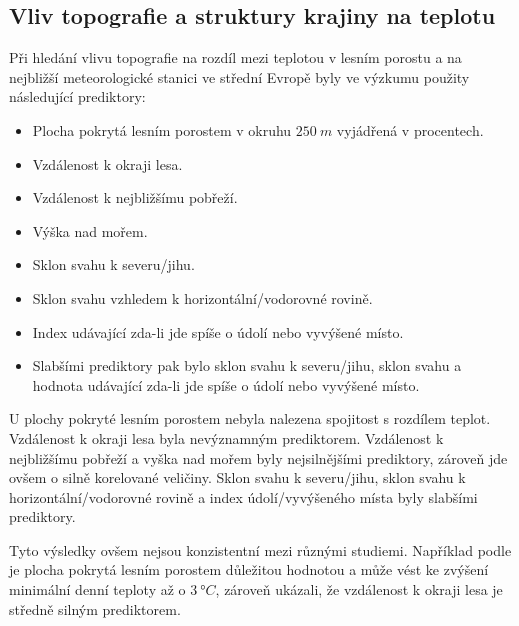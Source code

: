 \subsection{Vliv topografie a struktury krajiny na teplotu}
Při hledání vlivu topografie na rozdíl mezi teplotou v lesním porostu a na nejbližší meteorologické stanici ve střední Evropě byly ve výzkumu \parencite{ZellwegerFlorian2019Sdou} použity následující prediktory:
\begin{itemize}
	\item Plocha pokrytá lesním porostem v okruhu $\SI{250}{m}$ vyjádřená v procentech.
	\item Vzdálenost k okraji lesa.
	\item Vzdálenost k nejbližšímu pobřeží.
	\item Výška nad mořem. 
	\item Sklon svahu k severu/jihu.
	\item Sklon svahu vzhledem k horizontální/vodorovné rovině.
	\item Index udávající zda-li jde spíše o údolí nebo vyvýšené místo.
	\item Slabšími prediktory pak bylo sklon svahu k severu/jihu, sklon svahu a hodnota udávající zda-li jde spíše o údolí nebo vyvýšené místo.
\end{itemize}
U plochy pokryté lesním porostem nebyla nalezena spojitost s rozdílem teplot. Vzdálenost k okraji lesa byla nevýznamným prediktorem. Vzdálenost k nejbližšímu pobřeží a vyška nad mořem byly nejsilnějšími prediktory, zároveň jde ovšem o silně korelované veličiny. Sklon svahu k severu/jihu, sklon svahu k horizontální/vodorovné rovině a index údolí/vyvýšeného místa byly slabšími prediktory.

Tyto výsledky ovšem nejsou konzistentní mezi různými studiemi. Například podle \parencite{GreiserCaroline2018Mmmi} je plocha pokrytá lesním porostem důležitou hodnotou a může vést ke zvýšení minimální denní teploty až o $\SI{3}{\degree C}$, zároveň \parencite{GreiserCaroline2018Mmmi} ukázali, že vzdálenost k okraji lesa je středně silným prediktorem.

